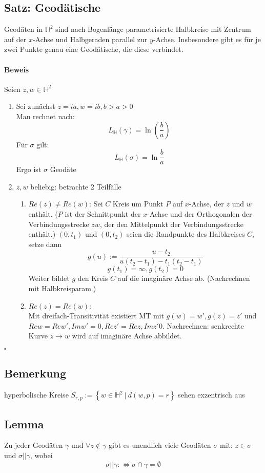 \documentclass{article}
\renewcommand{\H}{\mathbb{H}}
\newcommand{\set}[2]{\left\lbrace #1~|~#2 \right\rbrace}
\newcommand{\qed}{\hfill $\square$}
\begin{document}
\subsection{Satz: Geodätische}
Geodäten in $\H^2$ sind nach Bogenlänge parametrisierte Halbkreise mit Zentrum auf der $x$-Achse und Halbgeraden parallel zur $y$-Achse. Insbesondere gibt es für je zwei Punkte genau eine Geodätische, die diese verbindet.

\paragraph{Beweis}
Seien $z,w \in \H^2$
\begin{enumerate}
	\item Sei zunächst $z = ia, w= ib, b > a > 0$\\
	Man rechnet nach:
	\[L_\H (\gamma) = \ln(\frac{b}{a}) \]
	Für $\sigma$ gilt:
	\[L_\H (\sigma) = \ln\frac{b}{a} \]
	Ergo ist $\sigma$ Geodäte
	\item $z,w$ beliebig: betrachte 2 Teilfälle
	\begin{enumerate}
		\item $Re (z) \neq Re(w)$: Sei $C$ Kreis um Punkt $P$ auf $x$-Achse, der $z$ und $w$ enthält. ($P$ ist der Schnittpunkt der $x$-Achse und der Orthogonalen der Verbindungsstrecke $zw$, der den Mittelpunkt der Verbindungsstrecke enthält.)
		$(0, t_1)$ und $(0,t_2)$ seien die Randpunkte des Halbkreises $C$, setze dann
		\[g(u) := \frac{u - t_2}{u(t_2 - t_1)- t_1(t_2 - t_1)}\]
		\[g(t_1) = \infty, g(t_2) = 0\]
		Weiter bildet $g$ den Kreis $C$ auf die imaginäre Achse ab. (Nachrechnen mit Halbkreisparam.)
		
		\item $Re (z) = Re(w)$:\\
		Mit dreifach-Transitivität existiert MT mit $g(w) = w', g(z) = z'$ und $Re w = Re w', Im w' =0, Re z' = Re z, Im z' 0$. Nachrechnen: senkrechte Kurve $z \rightarrow w$ wird auf imaginäre Achse abbildet.
	\end{enumerate}
\end{enumerate}
\qed

\subsection{Bemerkung}
hyperbolische Kreise $S_{r,p} := \set{w\in \H^2}{d(w,p) = r}$ sehen exzentrisch aus

\subsection{Lemma}
Zu jeder Geodäten $\gamma$ und $\forall z \notin \gamma$ gibt es unendlich viele Geodäten $\sigma$ mit: $z \in \sigma $ und $\sigma || \gamma$, wobei 
\[\sigma || \gamma : \Leftrightarrow \sigma \cap \gamma = \emptyset \]
\end{document}
